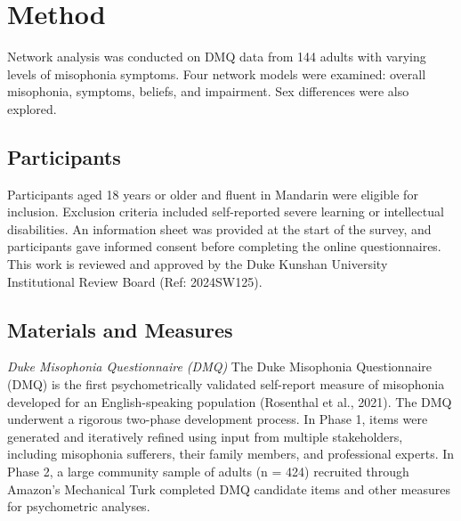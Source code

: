 \section{Method}
Network analysis was conducted on DMQ data from 144 adults with varying levels of misophonia symptoms. Four network models were examined: overall misophonia, symptoms, beliefs, and impairment. Sex differences were also explored.
\subsection{Participants}
Participants aged 18 years or older and fluent in Mandarin were eligible for inclusion. Exclusion criteria included self-reported severe learning or intellectual disabilities. An information sheet was provided at the start of the survey, and participants gave informed consent before completing the online questionnaires. This work is reviewed and approved by the Duke Kunshan University Institutional Review Board (Ref: 2024SW125). 
\subsection{Materials and Measures}
\textit{Duke Misophonia Questionnaire (DMQ)}
The Duke Misophonia Questionnaire (DMQ) is the first psychometrically validated self-report measure of misophonia developed for an English-speaking population (Rosenthal et al., 2021). The DMQ underwent a rigorous two-phase development process. In Phase 1, items were generated and iteratively refined using input from multiple stakeholders, including misophonia sufferers, their family members, and professional experts. In Phase 2, a large community sample of adults (n = 424) recruited through Amazon’s Mechanical Turk completed DMQ candidate items and other measures for psychometric analyses. 


